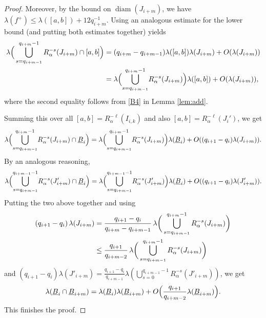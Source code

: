 \documentclass[10pt,a4paper]{amsart}
\DeclareMathOperator{\diam}{diam}
\begin{document}
\begin{proof}
Moreover, by the bound on $\diam(J_{i+m})$, we have $\lambda(f^+)\leq \lambda([a,b])+ 12 q_{i+m}^{-1}$. Using an analogous estimate for the lower bound (and putting both estimates together) yields
\begin{align*}
 \lambda\Big(\bigcup_{ s=q_{i+m-1}}^{q_{i+m}-1}R^{-s}_\alpha(J_{i+m})\cap [a,b]\Big)
 &={ \left(q_{i+m}-q_{i+m-1}\right)}\lambda([a,b])\lambda(J_{i+m})+{\rm O}(\lambda(J_{i+m}))\\
 &= \lambda\Big({ \bigcup_{s=q_{i+m-1}}^{q_{i+m}-1}}R^{-s}_\alpha(J_{i+m})\Big)\lambda([a,b])+{\rm O}(\lambda(J_{i+m})),
\end{align*}
where the second equality follows from \ref{B4} in Lemma \ref{lem:add}.

Summing this over all $[a,b]=R_{\alpha}^{-\ell} (I_{i,k})$ and also $[a,b]=R_\alpha^{-\ell}(J_{i}')$, we get 
$$
\lambda\Big({\bigcup_{s=q_{i+m-1}}^{q_{i+m}-1}}R^{-s}_\alpha(J_{i+m})\cap \underline{B}_i\Big)
=\lambda\Big({ \bigcup_{s=q_{i+m-1}}^{q_{i+m}-1}}R^{-s}_\alpha(J_{i+m})\Big)\lambda( \underline{B}_i)+{\rm O}({\left(q_{i+1}-q_i\right)}\lambda(J_{i+m})).
$$
By an analogous reasoning,  
$$
\lambda\Big({ \bigcup_{s=q_{i+m-1}}^{q_{i+m-1}-1}}R^{-s}_\alpha(J'_{i+m})\cap \underline{B}_i\Big)=\lambda\Big({ \bigcup_{s=q_{i+m-1}}^{q_{i+m-1}-1}}R^{-s}_\alpha(J'_{i+m})\Big)\lambda( \underline{B}_i)+{\rm O}({\left(q_{i+1}-q_i\right)}\lambda(J'_{i+m})).
$$
Putting the two above together and using \begin{align}
 \left(q_{i+1}-q_i\right)\lambda(J_{i+m})
 &= \frac{q_{i+1}-q_i}{q_{i+m}-q_{i+m-1}}\,\lambda\bigg(\bigcup_{s=q_{i+m-1}}^{q_{i+m}-1}R^{-s}_\alpha(J_{i+m})\bigg)\notag\\
 &\leq \frac{q_{i+1}}{q_{i+m-2}}\,\lambda\bigg(\bigcup_{s=q_{i+m-1}}^{q_{i+m}-1}R^{-s}_\alpha(J_{i+m})\bigg)\label{eq: qi lambdaJi}
\end{align}
and ${ (q_{i+1}-q_i)}\lambda(J'_{i+m})= \frac{ q_{i+1}-q_i}{q_{i+m-1}}\lambda(\bigcup_{s=0}^{q_{i+m-1}-1}R^{-s}_\alpha(J'_{i+m}))$,
we get 
$$
\lambda(\underline{B}_i\cap \underline{B}_{i+m})= \lambda(\underline{B}_i)\lambda(\underline{B}_{i+m})+{\rm O}\Big(\frac{q_{i+1}}{ q_{i+m-2}}\lambda(\underline{B}_{i+m})\Big).
$$
This finishes the proof.
\end{proof}
\end{document}
